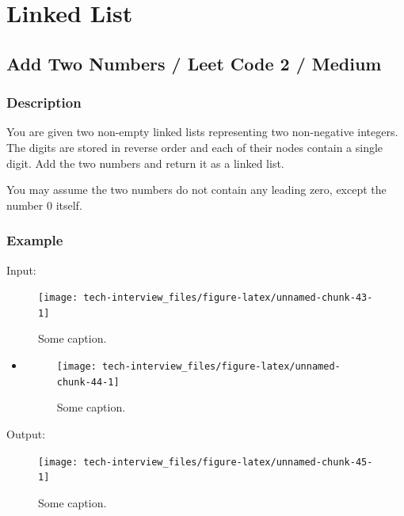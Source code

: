 \documentclass[]{book}
\begin{document}
\hypertarget{linked-list}{%
\chapter{Linked List}\label{linked-list}}

\hypertarget{add-two-numbers-leet-code-2-medium}{%
\section{Add Two Numbers / Leet Code 2 / Medium}\label{add-two-numbers-leet-code-2-medium}}

\hypertarget{description-86}{%
\subsection{Description}\label{description-86}}

You are given two non-empty linked lists representing two non-negative integers. The digits are stored in
reverse order and each of their nodes contain a single digit. Add the two numbers and return it as a linked
list.

You may assume the two numbers do not contain any leading zero, except the number 0 itself.

\hypertarget{example-82}{%
\subsection{Example}\label{example-82}}

Input:

\begin{figure}
\texttt{[image: tech-interview\_files/figure-latex/unnamed-chunk-43-1]} \caption{Some caption.}\label{fig:unnamed-chunk-43}
\end{figure}

\begin{itemize}
\item
  \begin{figure}
  \texttt{[image: tech-interview\_files/figure-latex/unnamed-chunk-44-1]} \caption{Some caption.}\label{fig:unnamed-chunk-44}
  \end{figure}
\end{itemize}

Output:

\begin{figure}
\texttt{[image: tech-interview\_files/figure-latex/unnamed-chunk-45-1]} \caption{Some caption.}\label{fig:unnamed-chunk-45}
\end{figure}
\end{document}
